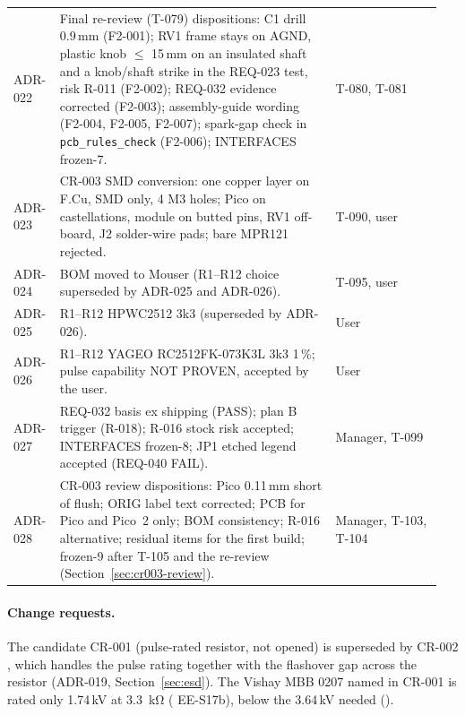 {\begin{longtable}{@{}>{\raggedright\arraybackslash}p{0.09\linewidth}>{\raggedright\arraybackslash}p{0.62\linewidth}>{\raggedright\arraybackslash}p{0.24\linewidth}@{}}
ADR-022 & Final re-review (T-079) dispositions: C1 drill 0.9\,mm (F2-001); RV1 frame stays on AGND, plastic knob $\le$ 15\,mm on an insulated shaft and a knob/shaft strike in the REQ-023 test, risk R-011 (F2-002); REQ-032 evidence corrected (F2-003); assembly-guide wording (F2-004, F2-005, F2-007); spark-gap check in \nolinkurl{pcb_rules_check} (F2-006); INTERFACES frozen-7. & T-080, T-081 \\
ADR-023 & CR-003 SMD conversion: one copper layer on F.Cu, SMD only, 4 M3 holes; Pico on castellations, module on butted pins, RV1 off-board, J2 solder-wire pads; bare MPR121 rejected. & T-090, user \\
ADR-024 & BOM moved to Mouser (R1--R12 choice superseded by ADR-025 and ADR-026). & T-095, user \\
ADR-025 & R1--R12 HPWC2512 3k3 (superseded by ADR-026). & User \\
ADR-026 & R1--R12 YAGEO RC2512FK-073K3L 3k3 1\,\%; pulse capability NOT PROVEN, accepted by the user. & User \\
ADR-027 & REQ-032 basis ex shipping (PASS); plan B trigger (R-018); R-016 stock risk accepted; INTERFACES frozen-8; JP1 etched legend accepted (REQ-040 FAIL). & Manager, T-099 \\
ADR-028 & CR-003 review dispositions: Pico 0.11\,mm short of flush; ORIG label text corrected; PCB for Pico and Pico~2 only; BOM consistency; R-016 alternative; residual items for the first build; frozen-9 after T-105 and the re-review (Section~\ref{sec:cr003-review}). & Manager, T-103, T-104 \\
\bottomrule
\end{longtable}
}

\paragraph{Change requests.} The candidate CR-001 (pulse-rated resistor, not
opened) is superseded by CR-002 , which handles the pulse
rating together with the flashover gap across the resistor (ADR-019,
Section~\ref{sec:esd}). The Vishay MBB 0207 named in CR-001 is rated only 1.74\,kV
at \qty{3.3}{\kilo\ohm} ( EE-S17b), below the 3.64\,kV needed
().
